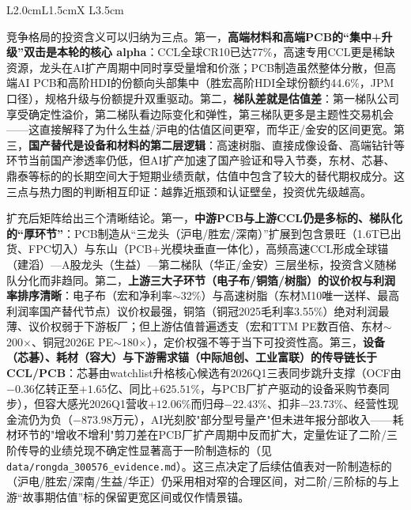 \begin{exhibitbox}[图表4-6：各环节竞争梯队与集中度]
\begin{tabularx}{\textwidth}{L{2.0cm}L{1.5cm}X L{3.5cm}}
\bottomrule
\end{tabularx}
\end{exhibitbox}

竞争格局的投资含义可以归纳为三点。第一，\textbf{高端材料和高端PCB的“集中+升级”双击是本轮的核心 alpha}：CCL全球CR10已达77\%，高速专用CCL更是稀缺资源，龙头在AI扩产周期中同时享受量增和价涨；PCB制造虽然整体分散，但高端AI PCB和高阶HDI的份额向头部集中（胜宏高阶HDI全球份额约44.6\%，JPM口径），规格升级与份额提升双重驱动。第二，\textbf{梯队差就是估值差}：第一梯队公司享受确定性溢价，第二梯队看边际变化和弹性，第三梯队更多是主题性交易机会——这直接解释了为什么生益/沪电的估值区间更窄，而华正/金安的区间更宽。第三，\textbf{国产替代是设备和材料的第二层逻辑}：高速树脂、直接成像设备、高端钻针等环节当前国产渗透率仍低，但AI扩产加速了国产验证和导入节奏，东材、芯碁、鼎泰等标的的长期空间大于短期业绩贡献，估值中包含了较大的替代期权成分。这三点与热力图的判断相互印证：越靠近瓶颈和认证壁垒，投资优先级越高。

扩充后矩阵给出三个清晰结论。第一，\textbf{中游PCB与上游CCL仍是多标的、梯队化的“厚环节”}：PCB制造从“三龙头（沪电/胜宏/深南）”扩展到包含景旺（1.6T已出货、FPC切入）与东山（PCB+光模块垂直一体化），高频高速CCL形成全球锚（建滔）—A股龙头（生益）—第二梯队（华正/金安）三层坐标，投资含义随梯队分化而非趋同。第二，\textbf{上游三大子环节（电子布/铜箔/树脂）的议价权与利润率排序清晰}：电子布（宏和净利率$\sim$32\%）与高速树脂（东材M10唯一送样、最高利润率国产替代节点）议价权最强，铜箔（铜冠2025毛利率3.55\%）绝对利润最薄、议价权弱于下游板厂；但上游估值普遍透支（宏和TTM PE数百倍、东材$\sim$200$\times$、铜冠2026E PE$\sim$180$\times$），定价权强不等于当下可投资性高。第三，\textbf{设备（芯碁）、耗材（容大）与下游需求锚（中际旭创、工业富联）的传导链长于CCL/PCB}：芯碁由watchlist升格核心候选有2026Q1三表同步跳升支撑（OCF由$-0.36$亿转正至$+1.65$亿、同比$+625.51\%$，与PCB厂扩产驱动的设备采购节奏同步），但容大感光2026Q1营收$+12.06\%$而归母$-22.43\%$、扣非$-23.73\%$、经营性现金流仍为负（$-873.98$万元），AI光刻胶"部分型号量产"但未进年报分部收入——耗材环节的"增收不增利"剪刀差在PCB厂扩产周期中反而扩大，定量佐证了二阶/三阶传导的业绩兑现不确定性显著高于一阶制造标的（见\texttt{data/rongda\_300576\_evidence.md}）。这三点决定了后续估值表对一阶制造标的（沪电/胜宏/深南/生益/华正）仍采用相对窄的合理区间，对二阶/三阶标的与上游“故事期估值”标的保留更宽区间或仅作情景锚。

